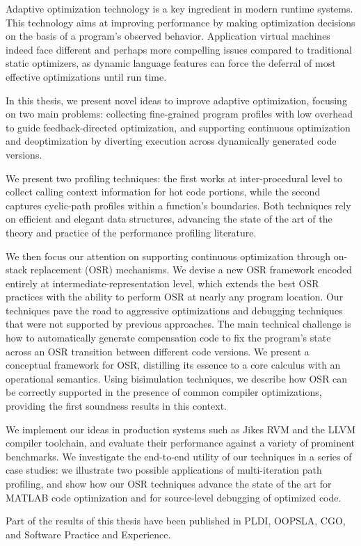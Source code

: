 
Adaptive optimization technology is a key ingredient in modern runtime systems. This technology aims at improving performance by making optimization decisions on the basis of a program's observed behavior. Application virtual machines indeed face different and perhaps more compelling issues compared to traditional static optimizers, as dynamic language features can force the deferral of most effective optimizations until run time.

In this thesis, we present novel ideas to improve adaptive optimization, focusing on two main problems: collecting fine-grained program profiles with low overhead to guide feedback-directed optimization, and supporting continuous optimization and deoptimization by diverting execution across dynamically generated code versions.

We present two profiling techniques: the first works at inter-procedural level to collect calling context information for hot code portions, while the second captures cyclic-path profiles within a function's boundaries. Both techniques rely on efficient and elegant data structures, advancing the state of the art of the theory and practice of the performance profiling literature.

We then focus our attention on supporting continuous optimization through on-stack replacement (OSR) mechanisms. We devise a new OSR framework encoded entirely at intermediate-representation level, which extends the best OSR practices with the ability to perform OSR at nearly any program location. Our techniques pave the road to aggressive optimizations and debugging techniques that were not supported by previous approaches. The main technical challenge is how to automatically generate compensation code to fix the program's state across an OSR transition between different code versions. We present a conceptual framework for OSR, distilling its essence to a core calculus with an operational semantics. Using bisimulation techniques, we describe how OSR can be correctly supported in the presence of common compiler optimizations, providing the first soundness results in this context.

We implement our ideas in production systems such as Jikes RVM and the LLVM compiler toolchain, and evaluate their performance against a variety of prominent benchmarks. We investigate the end-to-end utility of our techniques in a series of case studies: we illustrate two possible applications of multi-iteration path profiling, and show how our OSR techniques advance the state of the art for MATLAB code optimization and for source-level debugging of optimized code.

Part of the results of this thesis have been published in PLDI, OOPSLA, CGO, and Software Practice and Experience.